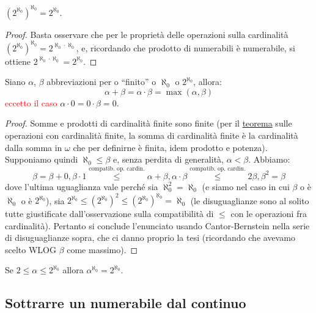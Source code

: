 \documentclass[11pt]{scrartcl}
\begin{document}
\begin{remark}
	$(2^{\aleph_0})^{\aleph_0} = 2^{\aleph_0}$.
\end{remark}

\begin{proof}
	Basta osservare che per le proprietà delle operazioni sulla cardinalità $(2^{\aleph_0})^{\aleph_0} = 2^{\aleph_0 \cdot \aleph_0}$, e, ricordando
	che prodotto di numerabili è numerabile, si ottiene $2^{\aleph_0 \cdot \aleph_0} = 2^{\aleph_0}$.
\end{proof}

\begin{lemma}
	Siano $\alpha$, $\beta$ abbreviazioni per o ``finito'' o $\aleph_0$ o $2^{\aleph_0}$, allora:
	\[ \alpha + \beta = \alpha \cdot \beta = \max(\alpha,\beta)
		\]
	\textcolor{red}{eccetto il caso} $\alpha \cdot 0 = 0 \cdot \beta = 0$.
\end{lemma}

\begin{proof}
	Somme e prodotti di cardinalità finite sono finite (per il \hyperref[op_card_fin]{teorema} sulle
	operazioni con cardinalità finite, la somma di cardinalità finite è la cardinalità dalla somma in $\omega$ che per definirne
	è finita, idem prodotto e potenza). Supponiamo quindi $\aleph_0 \leq \beta$ e, senza perdita di generalità, $\alpha < \beta$.
	Abbiamo:
	\[ \beta = \beta + 0, \beta \cdot 1 \overset{\text{compatib. op. cardin.}}{\leq} \alpha + \beta, \alpha \cdot \beta \overset{\text{compatib. op. cardin.}}{\leq} 2\beta, \beta^2 = \beta
		\]
	dove l'ultima uguaglianza vale perché sia $\aleph_0^2 = \aleph_0$ (e siamo nel caso in cui $\beta$ o è $\aleph_0$ o è $2^{\aleph_0}$), sia $2^{\aleph_0} \leq (2^{\aleph_0})^2 \leq (2^{\aleph_0})^{\aleph_0}  = \aleph_0$ (le disuguaglianze 
	sono al solito tutte giustificate dall'osservazione sulla compatibilità di $\leq$ con le operazioni fra cardinalità). Pertanto si conclude l'enunciato usando Cantor-Bernstein nella serie di disuguaglianze sopra, 
	che ci danno proprio la tesi (ricordando che avevamo scelto WLOG $\beta$ come massimo).
\end{proof}

\begin{lemma}[$\alpha^{\aleph_0} = 2^{\aleph_0}$]
	Se $2 \leq \alpha \leq 2^{\aleph_0}$ allora $\alpha^{\aleph_0} = 2^{\aleph_0}$.
\end{lemma}

\subsection{Sottrarre un  numerabile dal continuo}
\newpage
\end{document}
